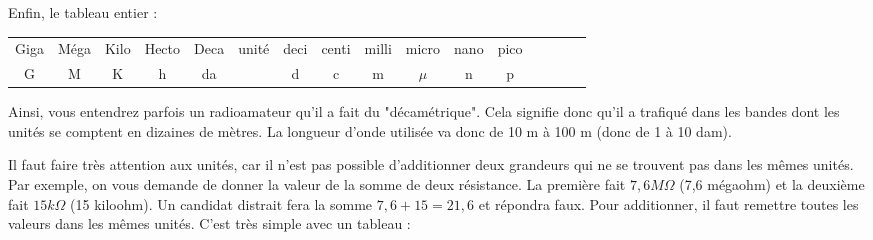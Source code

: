 	Enfin, le tableau entier :
    \begin{center}
        \begin{tabular}{|c|c|c|c|c|c|c|c|c|c|c|c|c|c|c|c|c|c|c|c|c|c|c|c|c|c|}
            \hline
                \multicolumn{3}{|c|}{Giga} & \multicolumn{3}{c|}{Méga} & Kilo & Hecto & Deca & unité & deci & centi & milli & \multicolumn{3}{c|}{micro} & \multicolumn{3}{c|}{nano} & \multicolumn{3}{c|}{pico}\\
                \multicolumn{3}{|c|}{G} & \multicolumn{3}{c|}{M} & K & h & da & & d & c & m & \multicolumn{3}{c|}{$\mu$} & \multicolumn{3}{c|}{n} & \multicolumn{3}{c|}{p}  \\
        	\hline
        \end{tabular}
    \end{center}

	Ainsi, vous entendrez parfois un radioamateur qu'il a fait du "décamétrique". Cela signifie donc qu'il a trafiqué dans les bandes dont les unités se comptent en dizaines de mètres. La longueur d'onde utilisée va donc de 10 m à 100 m (donc de 1 à 10 dam).

	Il faut faire très attention aux unités, car il n'est pas possible d'additionner deux grandeurs qui ne se trouvent pas dans les mêmes unités. Par exemple, on vous demande de donner la valeur de la somme de deux résistance. La première fait $7,6 M\Omega$ (7,6 mégaohm) et la deuxième fait $15 k\Omega$ (15 kiloohm). Un candidat distrait fera la somme $7,6 + 15 = 21,6$ et répondra faux. Pour additionner, il faut remettre toutes les valeurs dans les mêmes unités. C'est très simple avec un tableau :

